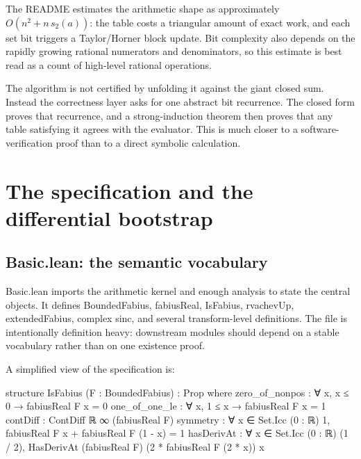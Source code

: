 \documentclass[11pt,a4paper,openany]{book}
\def\module#1{#1.lean}
\def\decl#1{#1}
\newcommand{\module}[1]{\nolinkurl{#1.lean}}
\newcommand{\decl}[1]{\texttt{\detokenize{#1}}}
\begin{document}
The README estimates the arithmetic shape as approximately
$O(n^2+n\,s_2(a))$: the table costs a triangular amount of exact work, and each
set bit triggers a Taylor/Horner block update.  Bit complexity also depends on
the rapidly growing rational numerators and denominators, so this estimate is
best read as a count of high-level rational operations.

\begin{proofidea}
The algorithm is not certified by unfolding it against the giant closed sum.
Instead the correctness layer asks for one abstract bit recurrence.  The closed
form proves that recurrence, and a strong-induction theorem then proves that
any table satisfying it agrees with the evaluator.  This is much closer to a
software-verification proof than to a direct symbolic calculation.
\end{proofidea}

\chapter{The specification and the differential bootstrap}
\label{ch:differential}

\section{\module{Basic}: the semantic vocabulary}
\module{Basic} imports the arithmetic kernel and enough analysis to state the
central objects.  It defines \decl{BoundedFabius}, \decl{fabiusReal},
\decl{IsFabius}, \decl{rvachevUp}, \decl{extendedFabius}, complex sinc, and
several transform-level definitions.  The file is intentionally definition
heavy: downstream modules should depend on a stable vocabulary rather than on
one existence proof.

A simplified view of the specification is:

\begin{LeanCode}
structure IsFabius (F : BoundedFabius) : Prop where
  zero_of_nonpos : ∀ x, x ≤ 0 → fabiusReal F x = 0
  one_of_one_le  : ∀ x, 1 ≤ x → fabiusReal F x = 1
  contDiff       : ContDiff ℝ ∞ (fabiusReal F)
  symmetry       : ∀ x ∈ Set.Icc (0 : ℝ) 1,
                     fabiusReal F x + fabiusReal F (1 - x) = 1
  hasDerivAt     : ∀ x ∈ Set.Icc (0 : ℝ) (1 / 2),
                     HasDerivAt (fabiusReal F)
                       (2 * fabiusReal F (2 * x)) x
\end{LeanCode}
\end{document}
